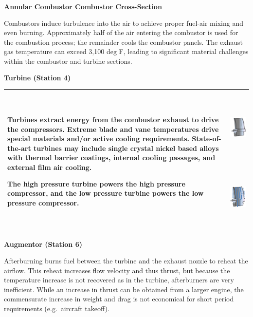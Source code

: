 \documentclass[
]{book}
\begin{document}
\textbf{Annular Combustor Combustor Cross-Section}

Combustors induce turbulence into the air to achieve proper fuel-air mixing and even burning. Approximately half of the air entering the combustor is used for the combustion process; the remainder cools the combustor panels. The exhaust gas temperature can exceed 3,100 deg F, leading to significant material challenges within the combustor and turbine sections.

\textbf{Turbine (Station 4)}

\begin{longtable}[]{@{}lc@{}}
\toprule
\endhead
\begin{minipage}[t]{0.58\columnwidth}\raggedright
Turbines extract energy from the combustor
exhaust to drive the compressors. Extreme
blade and vane temperatures drive special
materials and/or active cooling
requirements. State-of-the-art turbines
may include single crystal nickel based
alloys with thermal barrier coatings,
internal cooling passages, and external
film air cooling.

The high pressure turbine powers the high
pressure compressor, and the low pressure
turbine powers the low pressure compressor.\strut
\end{minipage} & \begin{minipage}[t]{0.36\columnwidth}\centering
\includegraphics[width=1.12986in,height=1.51875in]{media/17/image10.jpeg}\includegraphics[width=1.05417in,height=1.37708in]{media/17/image11.png}\strut
\end{minipage}\tabularnewline
\bottomrule
\end{longtable}

\textbf{Augmentor (Station 6)}

Afterburning burns fuel between the turbine and the exhaust nozzle to reheat the
airflow. This reheat increases flow velocity and thus thrust, but because the
temperature increase is not recovered as in the turbine, afterburners are very
inefficient. While an increase in thrust can be obtained from a larger engine,
the commensurate increase in weight and drag is not economical for short period
requirements (e.g.~aircraft takeoff).
\end{document}
